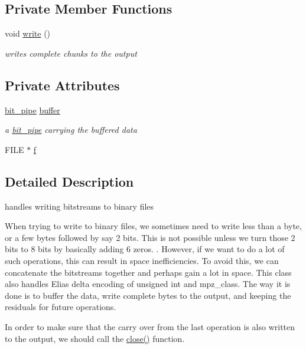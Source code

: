 \subsection*{Private Member Functions}
\begin{DoxyCompactItemize}
\item 
void \hyperlink{classobitstream_a5ac23633932baad040856f0a33ee1ebf}{write} ()
\begin{DoxyCompactList}\small\item\em writes complete chunks to the output \end{DoxyCompactList}\end{DoxyCompactItemize}
\subsection*{Private Attributes}
\begin{DoxyCompactItemize}
\item 
\hyperlink{classbit__pipe}{bit\+\_\+pipe} \hyperlink{classobitstream_aeaccad00a395a404aa16472bfa052be3}{buffer}
\begin{DoxyCompactList}\small\item\em a \hyperlink{classbit__pipe}{bit\+\_\+pipe} carrying the buffered data \end{DoxyCompactList}\item 
F\+I\+LE $\ast$ \hyperlink{classobitstream_ac589d74745217748c888ae777ab324a7}{f}
\end{DoxyCompactItemize}


\subsection{Detailed Description}
handles writing bitstreams to binary files 

When trying to write to binary files, we sometimes need to write less than a byte, or a few bytes followed by say 2 bits. This is not possible unless we turn those 2 bits to 8 bits by basically adding 6 zeros. . However, if we want to do a lot of such operations, this can result in space inefficiencies. To avoid this, we can concatenate the bitstreams together and perhaps gain a lot in space. This class also handles Elias delta encoding of unsigned int and mpz\+\_\+class. The way it is done is to buffer the data, write complete bytes to the output, and keeping the residuals for future operations.

In order to make sure that the carry over from the last operation is also written to the output, we should call the \hyperlink{classobitstream_a6d76dbba302e1181fbc9609072a4c2a0}{close()} function. 

